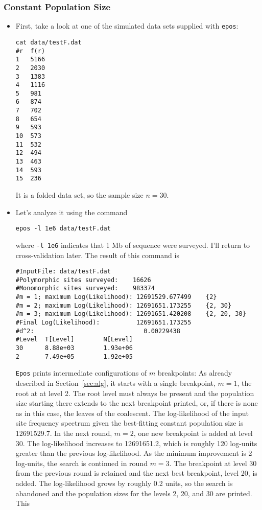 \documentclass[a4paper, english]{article}
\newcommand{\ty}{\texttt}
\begin{document}
\subsubsection{Constant Population Size}
\begin{itemize}
\item First, take a look at one of the simulated data sets supplied
  with \ty{epos}:
\begin{verbatim}
cat data/testF.dat 
#r	f(r)
1	5166
2	2030
3	1383
4	1116
5	981
6	874
7	702
8	654
9	593
10	573
11	532
12	494
13	463
14	593
15	236
\end{verbatim}
It is a folded data set, so the sample size $n=30$.
\item Let's analyze it using the command
\begin{verbatim}
epos -l 1e6 data/testF.dat 
\end{verbatim}
where \ty{-l 1e6} indicates that 1 Mb of sequence were surveyed. I'll return to cross-validation
later. The result of this command is
\begin{verbatim}
#InputFile:	data/testF.dat
#Polymorphic sites surveyed:	16626
#Monomorphic sites surveyed:	983374
#m = 1; maximum Log(Likelihood): 12691529.677499	{2}
#m = 2; maximum Log(Likelihood): 12691651.173255	{2, 30}
#m = 3; maximum Log(Likelihood): 12691651.420208	{2, 20, 30}
#Final Log(Likelihood):          12691651.173255
#d^2:                              0.00229438
#Level  T[Level]        N[Level]
30      8.88e+03        1.93e+06
2       7.49e+05        1.92e+05
\end{verbatim}
\ty{Epos} prints intermediate configurations of $m$ breakpoints: As
already described in Section~\ref{sec:alg}, it starts with a single
breakpoint, $m=1$, the root at at level 2. The root level must always
be present and the population size starting there extends to the next
breakpoint printed, or, if there is none as in this case, the leaves
of the coalescent. The log-likelihood of the input site frequency
spectrum given the best-fitting constant population size is
12691529.7. In the next round, $m=2$, one new breakpoint is added at
level 30. The log-likelihood increases to 12691651.2, which is roughly
120 log-units greater than the previous log-likelihood. As the minimum
improvement is 2 log-units, the search is continued in round
$m=3$. The breakpoint at level 30 from the previous round is retained
and the next best breakpoint, level 20, is added. The log-likelihood
grows by roughly 0.2 units, so the search is abandoned and the
population sizes for the levels 2, 20, and 30 are printed. This

\end{itemize}
\end{document}
